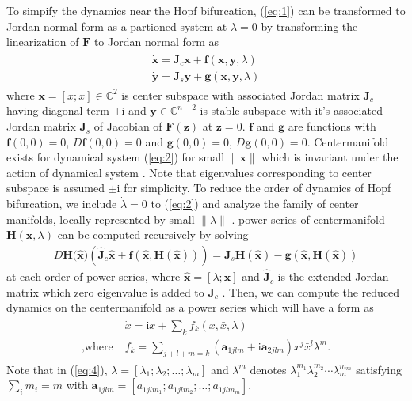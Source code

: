 \documentclass[openacc]{rsproca_new}%
\def\complex{\mathbb{C}}
\def\vec#1{\ensuremath{\mathbf{#1}}}
\newcommand{\Eref}[1]{(\ref{#1})}
\begin{document}
To simpify the dynamics near the Hopf bifurcation, \Eref{eq:1} can be transformed to Jordan normal form as a partioned system at \(\lambda=0\) by transforming the linearization of \(\vec{F}\) to Jordan normal form as
\begin{align}\label{eq:2}
  \begin{split}
    \dot{\vec{x}} =\vec{J}_c \vec{x} + \vec{f}(\vec{x},\vec{y},\lambda)\\
    \dot{\vec{y}} =\vec{J}_s \vec{y} +\vec{g}(\vec{x},\vec{y},\lambda)
  \end{split}
\end{align}
where $\vec{x}=[x;\bar{x}]\in \complex^2$ is center subspace with associated Jordan matrix $\vec{J}_c$ having diagonal term $\pm\textrm{i}$ and $\vec{y}\in \complex^{n-2}$ is stable subspace with it's associated Jordan matrix $\vec{J}_s$ of Jacobian of $\vec{F}(\vec{z})$ at $\vec{z}=0$.
$\vec{f}$ and $\vec{g}$ are functions with $\vec{f}(0,0)=0$, $D\vec{f}(0,0)=0$ and $\vec{g}(0,0)=0$, $D\vec{g}(0,0)=0$. Centermanifold exists for dynamical system \Eref{eq:2} for small  $\|\vec{x}\|$ which is invariant under the action of dynamical system \cite{carr2012applications}. Note that eigenvalues corresponding to center subspace is assumed $\pm\textrm{i}$ for simplicity. To reduce the order of dynamics of Hopf bifurcation, we include $\dot\lambda=0$ to \Eref{eq:2} and analyze the family of center manifolds, locally represented by small $\|\lambda\|$  \cite{kuznetsov2013elements}. power series of centermanifold $\vec{H}(\vec{x},\lambda)$ can be computed recursively by solving
\begin{align}\label{eq:3}
    D\vec{H}({\vec{\hat{x})}}(\vec{\hat{J}}_c\vec{\hat{x}}+\vec{f}(\vec{\hat{x}},\vec{H}(\vec{\hat{x}}))) =\vec{J}_s \vec{H}(\vec{\hat{x}})-\vec{g}(\vec{\hat{x}},\vec{H}(\vec{\hat {x}}))
\end{align}
at each order of power series, where \(\vec{\hat{x}}=[\lambda;\vec{x}]\) and \(\vec{\hat{J}}_c\) is the extended Jordan matrix which zero eigenvalue is added to \(\vec{J}_c\) \cite{bi1999symbolic}. Then, we can compute the reduced dynamics on the centermanifold as a power series which will have a form as
\begin{align}\label{eq:4}
  \begin{split}
    {}&\dot{x} =\textrm{i} x+\sum_k f_k(x,\bar{x},\lambda)\\
    ,\textrm{where} \; & f_k=\sum_{j+l+m=k}(\vec{a}_{1jlm}+\textrm{i}\vec{a}_{2jlm})x^j\bar{x}^l\lambda^m.
  \end{split}
\end{align}
Note that in \Eref{eq:4}, \(\lambda=[\lambda_1;\lambda_2;\ldots;\lambda_m]\) and \(\lambda^m\) denotes \(\lambda_1^{m_1}\lambda_2^{m_2}\cdots\lambda_m^{m_m}\) satisfying \(\sum_i m_i = m\) with \(\vec{a}_{1jlm}=[a_{1jlm_1};a_{1jlm_2};\ldots;a_{1jlm_m}]\).
\end{document}
